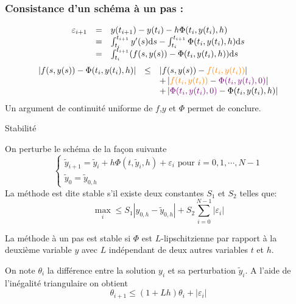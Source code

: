 \documentclass{beamer}
\def \de {{\rm d}}
\begin{document}
 \begin{frame}
\frametitle{Consistance d'un schéma à un pas :}
\[\begin{array}{ccl}
\varepsilon_{i+1}&=&y(t_{i+1})-y(t_{i})-h \Phi(t_i,y(t_i),h)\\
&=& \int_{t_i}^{t_{i+1}}y'(s)\de s- \int_{t_i}^{t_{i+1}}\Phi(t_i,y(t_i),h)\de s\\
&=& \int_{t_i}^{t_{i+1}}(f(s,y(s))-\Phi(t_i,y(t_i),h))\de s
\end{array}
\]
\[\begin{array}{ccl}
\left|f(s,y(s))-\Phi(t_i,y(t_i),h)\right|&\leq&\left|f(s,y(s))-\textcolor{orange}{ f(t_i,y(t_i))}\right|\\
&&+\left|\textcolor{orange}{ f(t_i,y(t_i))}-\textcolor{violet}{ \Phi(t_i,y(t_i),0)}\right|\\
&&+\left|\textcolor{violet}{ \Phi(t_i,y(t_i),0)}-\Phi(t_i,y(t_i),h)\right|

\end{array}
\]
Un argument de continuité uniforme de $f$,$y$ et $\Phi$ permet de conclure.

 \end{frame}
 
 \begin{frame}
 \begin{block}{Stabilité}

On perturbe le schéma de la façon suivante
\[\left\{\begin{array}{l}
\tilde{y}_{i+1} =\tilde{y}_{i}+ h \Phi(t, \tilde{y}_i,h)+\varepsilon_i \mbox{ pour }i=0,1,\cdots,N-1\\
\tilde{y}_0 = \tilde{y}_{0,h}
\end{array}\right.
\]
La méthode est dite stable s'il existe deux constantes $S_1$ et $S_2$ telles que:
 \[\max_i\leq S_1\left|y_{0,h}-\tilde{y}_{0,h}\right|+S_2\sum_{i=0}^{N-1}\left|\varepsilon_i\right|\]
\end{block}
\begin{theorem}
La méthode à un pas est stable si $\Phi$ est $L$-lipschitzienne par rapport à la deuxième variable $y$ avec $L$ indépendant de deux autres variables $t$ et $h$.

\end{theorem}
On note $\theta_i$ la différence entre la solution $y_i$ et sa perturbation $\tilde{y}_{i}$. A l'aide de l'inégalité triangulaire on obtient
\[\theta_{i+1}\leq (1+L h)\theta_i +|\varepsilon_i|\]
\end{frame}
 
\end{document}
